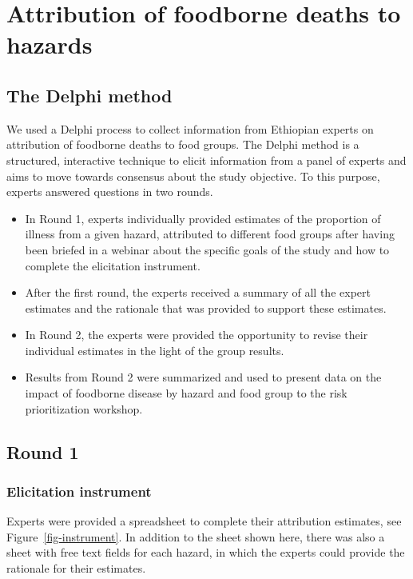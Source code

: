 \documentclass[
  letterpaper,
  DIV=11,
  numbers=noendperiod]{scrartcl}
\begin{document}
\section{Attribution of foodborne deaths to
hazards}\label{attribution-of-foodborne-deaths-to-hazards}

\subsection{The Delphi method}\label{the-delphi-method}

We used a Delphi process to collect information from Ethiopian experts
on attribution of foodborne deaths to food groups. The Delphi method is
a structured, interactive technique to elicit information from a panel
of experts and aims to move towards consensus about the study objective.
To this purpose, experts answered questions in two rounds.

\begin{itemize}
\item
  In Round 1, experts individually provided estimates of the proportion
  of illness from a given hazard, attributed to different food groups
  after having been briefed in a webinar about the specific goals of the
  study and how to complete the elicitation instrument.
\item
  After the first round, the experts received a summary of all the
  expert estimates and the rationale that was provided to support these
  estimates.
\item
  In Round 2, the experts were provided the opportunity to revise their
  individual estimates in the light of the group results.
\item
  Results from Round 2 were summarized and used to present data on the
  impact of foodborne disease by hazard and food group to the risk
  prioritization workshop.
\end{itemize}

\subsection{Round 1}\label{round-1}

\subsubsection{Elicitation instrument}\label{elicitation-instrument}

Experts were provided a spreadsheet to complete their attribution
estimates, see Figure~\ref{fig-instrument}. In addition to the sheet
shown here, there was also a sheet with free text fields for each
hazard, in which the experts could provide the rationale for their
estimates.
\end{document}
